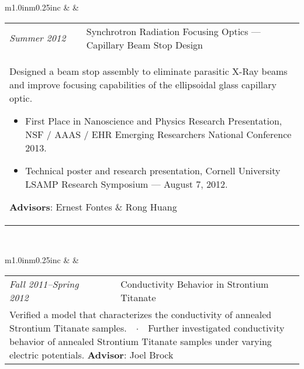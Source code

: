 \documentclass[11pt]{article}
\begin{document}
\vspace{0.25cm}

\begin{tabular}{m{1.0in}m{0.25in}c}
 & & 
\begin{tabular}{m{0.85in}m{0.15in}m{3.75in}}
\textit{\small{Summer 2012}} & & Synchrotron Radiation Focusing Optics --- Capillary Beam Stop Design \\ \multicolumn{3}{p{4.75in}}{\footnotesize{Designed a beam stop assembly to eliminate parasitic X-Ray beams and improve focusing capabilities of the ellipsoidal glass capillary optic. \noindent\begin{itemize}[leftmargin=*] \item \textcolor{NavyBlue}{First Place in Nanoscience and Physics Research Presentation}, NSF / AAAS / EHR Emerging Researchers National Conference 2013. \item Technical poster and research presentation, Cornell University LSAMP Research Symposium --- August 7, 2012. \end{itemize} \textbf{Advisors}: Ernest Fontes \& Rong Huang}} 
\end{tabular} \\ 
\end{tabular}

\vspace{0.25cm}

\begin{tabular}{m{1.0in}m{0.25in}c}
 & & 
\begin{tabular}{m{0.85in}m{0.15in}m{3.75in}}
\textit{\small{Fall 2011--Spring 2012}} & & Conductivity Behavior in Strontium Titanate \\ \multicolumn{3}{p{4.75in}}{\footnotesize{Verified a model that characterizes the conductivity of annealed Strontium Titanate samples.\ \ $\cdotp$\ \ Further investigated conductivity behavior of annealed Strontium Titanate samples under varying electric potentials. \newline \textbf{Advisor}: Joel Brock}} 
\end{tabular} \\ 
\end{tabular}

\vspace{0.25cm}
\end{document}
